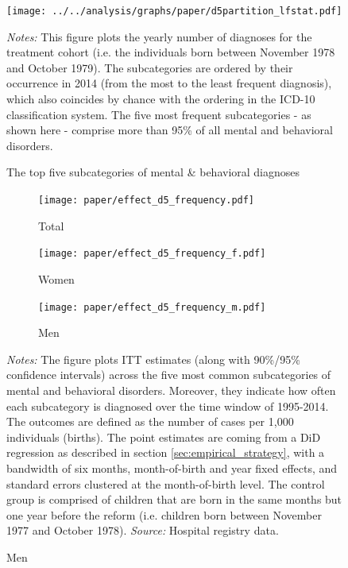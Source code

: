\documentclass[11pt, a4paper]{article} %
\begin{document}
  
\vspace*{\fill}
\begin{figure}[H]\centering
	\caption{The top five subcategories of mental \& behavioral diagnoses}\label{fig: d5partition}
	\texttt{[image: ../../analysis/graphs/paper/d5partition\_lfstat.pdf]}
	\scriptsize
	\begin{minipage}{0.9\linewidth}
	\emph{Notes:} This figure plots the yearly number of diagnoses for the treatment cohort (i.e. the individuals born between November 1978 and October 1979). The subcategories are ordered by their occurrence in 2014 (from the most to the least frequent diagnosis), which also coincides by chance with the ordering in the ICD-10 classification system. The five most frequent subcategories - as shown here - comprise more than 95\% of all mental and behavioral disorders. 
	\end{minipage}
\end{figure}
\vspace*{\fill}\clearpage%
\begin{landscape}
	\vspace*{\fill}
	\begin{figure}
		[H]\centering
		\caption{ITT effect for \textbf{subcategories of mental \& behavioral disorders (pooled)}}\label{fig: ITT_d5_subcategories}
		\begin{subfigure}[h]{0.31\linewidth}\centering\caption{Total}
			\texttt{[image: paper/effect\_d5\_frequency.pdf]}
		\end{subfigure}
		\begin{subfigure}[h]{0.31\linewidth}\centering\caption{Women}
			\texttt{[image: paper/effect\_d5\_frequency\_f.pdf]}
		\end{subfigure}
		\begin{subfigure}[h]{0.31\linewidth}\centering\caption{Men}
			\texttt{[image: paper/effect\_d5\_frequency\_m.pdf]}
		\end{subfigure}
		\scriptsize
		\begin{minipage}{0.95\linewidth}
			\emph{Notes:} The figure plots ITT estimates (along with 90\%/95\% confidence intervals) across the five most common subcategories of mental and behavioral disorders. Moreover, they indicate how often each subcategory is diagnosed over the time window of 1995-2014. The outcomes are defined as the number of cases per 1,000 individuals (births). The point estimates are coming from a DiD regression as described in section \ref{sec:empirical_strategy}, with a bandwidth of six months, month-of-birth and year fixed effects, and standard errors clustered at the month-of-birth level. The control group is comprised of children that are born in the same months but one year before the reform (i.e. children born between November 1977 and October 1978).\newline
			\emph{Source:} Hospital registry data.
		\end{minipage}
	\end{figure}
	\vspace*{\fill}\clearpage
\end{landscape}
\end{document}
